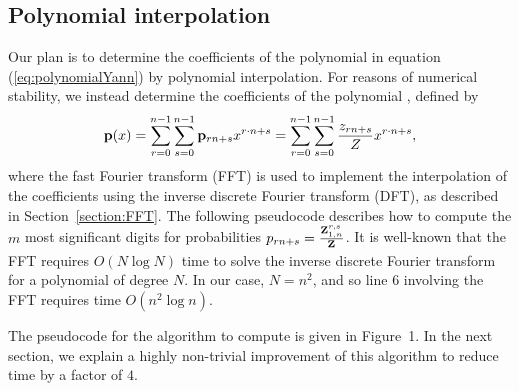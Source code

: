 \subsection{Polynomial interpolation}
Our plan is to determine the coefficients of the polynomial
\emZ{} in equation (\ref{eq:polynomialYann}) by
polynomial interpolation.  For reasons of numerical stability,
we instead determine the coefficients of the polynomial \bfPofX,
defined by
\begin{align}
\label{eq:polynomialYannP}
\bfPofX =
\sum_{r=0}^{n-1} \sum_{s=0}^{n-1}  \bfP_{rn+s}
 x^{r\cdot n + s} =
\sum_{r=0}^{n-1} \sum_{s=0}^{n-1}  \frac{z_{rn+s}}{Z}
 x^{r\cdot n + s},
\end{align}
where the fast Fourier transform (FFT) is used to implement the
interpolation of
the coefficients using the inverse discrete Fourier transform (DFT), as
described in Section~\ref{section:FFT}.  The following pseudocode describes how
to compute the $m$ most significant digits
for probabilities
$p_{rn+s} = \frac{{\bf Z}^{r,s}_{1,n}}{{\bf Z}^{}_{}}$. It is well-known that
the FFT requires $O(N \log N)$ time to solve the inverse discrete
Fourier transform for a polynomial of degree $N$. In our case,
$N=n^2$, and so line 6 involving the FFT requires time $O(n^2 \log n)$.

The pseudocode for the algorithm to compute \bfPofX is given in
Figure~1.
In the next section, we explain a highly non-trivial improvement of
this algorithm to reduce time by a factor of $4$.

